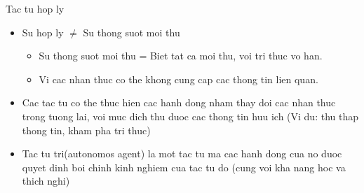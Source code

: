 \documentclass[12pt]{beamer}
\begin{document}
\begin{frame}{Tac tu hop ly}
\begin{itemize}
    \item Su hop ly $\ne$ Su thong suot moi thu\\
    \begin{itemize}
        \item Su thong suot moi thu = Biet tat ca moi thu, voi tri thuc vo han.\\
        \item Vi cac nhan thuc co the khong cung cap cac thong tin lien quan.\\
    \end{itemize}
    \item Cac tac tu co the thuc hien cac hanh dong nham thay doi cac nhan thuc trong tuong lai, voi muc dich thu duoc cac thong tin huu ich (Vi du: thu thap thong tin, kham pha tri thuc)\\
    \item Tac tu tri(autonomos agent) la mot tac tu ma cac hanh dong cua no duoc quyet dinh boi chinh kinh nghiem cua tac tu do (cung voi kha nang hoc va thich nghi)\\
\end{itemize}

\end{frame}
\end{document}
